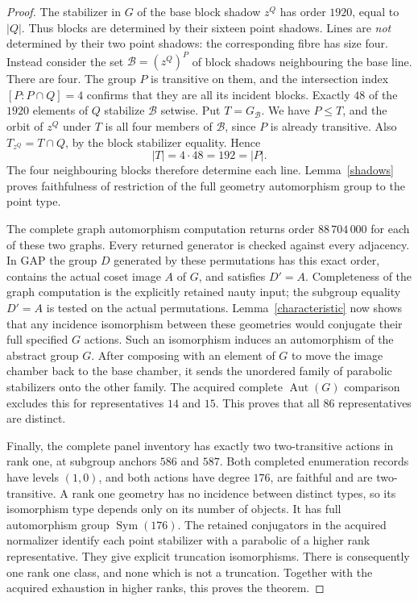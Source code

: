 \documentclass[11pt]{article}
\newcommand{\Aut}{\operatorname{Aut}}
\begin{document}
\begin{proof}
The stabilizer in $G$ of the base block shadow $z^Q$ has order $1920$,
equal to $|Q|$. Thus blocks are determined by their sixteen point
shadows. Lines are \emph{not} determined by their two point shadows:
the corresponding fibre has size four. Instead consider the set
$\mathcal B=(z^Q)^P$ of block shadows neighbouring the base line.
There are four. The group $P$ is transitive on them, and the
intersection index $[P:P\cap Q]=4$ confirms that they are all its
incident blocks. Exactly $48$ of the $1920$ elements of $Q$ stabilize
$\mathcal B$ setwise. Put $T=G_{\mathcal B}$. We have $P\leq T$,
and the orbit of $z^Q$ under $T$ is all four members of
$\mathcal B$, since $P$ is already transitive. Also
$T_{z^Q}=T\cap Q$, by the block stabilizer equality. Hence
\[
                  |T|=4\cdot48=192=|P|.
\]
The four neighbouring blocks therefore determine each line.
Lemma~\ref{shadows} proves faithfulness of restriction of the full
geometry automorphism group to the point type.

The complete graph automorphism computation returns order
$88\,704\,000$ for each of these two graphs. Every returned generator
is checked against every adjacency. In GAP the group $D$ generated
by these permutations has this exact order, contains the actual
coset image $A$ of $G$, and satisfies $D'=A$. Completeness of the
graph computation is the explicitly retained nauty input; the
subgroup equality $D'=A$ is tested on the actual permutations.
Lemma~\ref{characteristic} now shows that any incidence isomorphism
between these geometries would conjugate their full specified $G$
actions. Such an isomorphism induces an automorphism of the abstract
group $G$. After composing with an element of $G$ to move the image
chamber back to the base chamber, it sends the unordered family of
parabolic stabilizers onto the other family. The acquired complete
$\Aut(G)$ comparison excludes this for representatives $14$ and $15$.
This proves that all $86$ representatives are distinct.

Finally, the complete panel inventory has exactly two two-transitive
actions in rank one, at subgroup anchors $586$ and $587$. Both
completed enumeration records have levels $(1,0)$, and both actions
have degree $176$, are faithful and are two-transitive. A rank one
geometry has no incidence between distinct types, so its isomorphism
type depends only on its number of objects. It has full automorphism
group $\operatorname{Sym}(176)$. The retained conjugators in the
acquired normalizer identify each point stabilizer with a parabolic
of a higher rank representative. They give explicit truncation
isomorphisms. There is consequently one rank one class, and none
which is not a truncation. Together with the acquired exhaustion in
higher ranks, this proves the theorem.
\end{proof}
\end{document}
